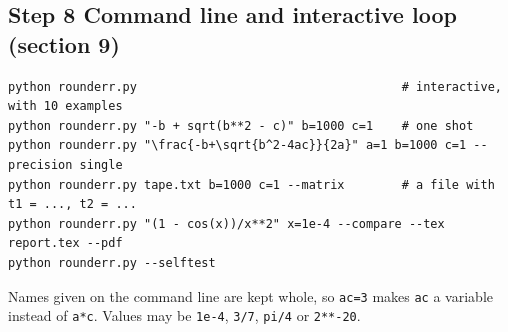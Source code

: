 \documentclass[11pt]{article}
\begin{document}
\subsection*{Step 8 \quad Command line and interactive loop (section 9)}
\begin{lstlisting}
python rounderr.py                                     # interactive, with 10 examples
python rounderr.py "-b + sqrt(b**2 - c)" b=1000 c=1    # one shot
python rounderr.py "\frac{-b+\sqrt{b^2-4ac}}{2a}" a=1 b=1000 c=1 --precision single
python rounderr.py tape.txt b=1000 c=1 --matrix        # a file with t1 = ..., t2 = ...
python rounderr.py "(1 - cos(x))/x**2" x=1e-4 --compare --tex report.tex --pdf
python rounderr.py --selftest
\end{lstlisting}
Names given on the command line are kept whole, so \verb|ac=3| makes \verb|ac| a variable instead of \verb|a*c|. Values may be \verb|1e-4|, \verb|3/7|, \verb|pi/4| or \verb|2**-20|.
\end{document}

